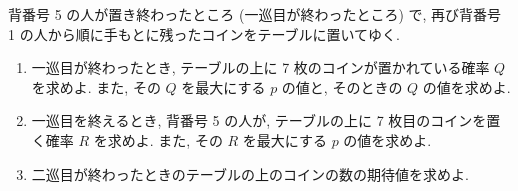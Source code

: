\documentclass[unicode,12pt, A4j]{ltjsarticle}%
\begin{document}
背番号 5 の人が置き終わったところ (一巡目が終わったところ) で, 再び背番号 1 の人から順に手もとに残ったコインをテーブルに置いてゆく.

\begin{enumerate}
    \item 一巡目が終わったとき, テーブルの上に 7 枚のコインが置かれている確率 $Q$ を求めよ. また, その $Q$ を最大にする $p$ の値と, そのときの $Q$ の値を求めよ.
    \item 一巡目を終えるとき, 背番号 5 の人が, テーブルの上に 7 枚目のコインを置く確率 $R$ を求めよ. また, その $R$ を最大にする $p$ の値を求めよ.
    \item 二巡目が終わったときのテーブルの上のコインの数の期待値を求めよ.
\end{enumerate}
\end{document}
